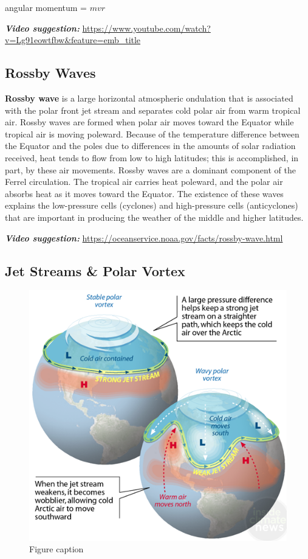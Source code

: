 \documentclass[12pt,oneside]{book}
\begin{document}
angular momentum = \(mvr\)

\textbf{\emph{Video suggestion:}}
\url{https://www.youtube.com/watch?v=Lg91eowtfbw\&feature=emb_title}

\subsection{Rossby Waves}\label{rossby-waves}

\textbf{Rossby wave} is a large horizontal atmospheric ondulation that
is associated with the polar front jet stream and separates cold polar
air from warm tropical air. Rossby waves are formed when polar air moves
toward the Equator while tropical air is moving poleward. Because of the
temperature difference between the Equator and the poles due to
differences in the amounts of solar radiation received, heat tends to
flow from low to high latitudes; this is accomplished, in part, by these
air movements. Rossby waves are a dominant component of the Ferrel
circulation. The tropical air carries heat poleward, and the polar air
absorbs heat as it moves toward the Equator. The existence of these
waves explains the low-pressure cells (cyclones) and high-pressure cells
(anticyclones) that are important in producing the weather of the middle
and higher latitudes.

\textbf{\emph{Video suggestion:}}
\url{https://oceanservice.noaa.gov/facts/rossby-wave.html}

\subsection{Jet Streams \& Polar Vortex}\label{jet-streams-polar-vortex}

\begin{figure}

{\centering \includegraphics[width=0.8\linewidth]{figures/Figure524a} 

}

\caption{Figure caption}\label{fig:Fig524a}
\end{figure}
\end{document}
